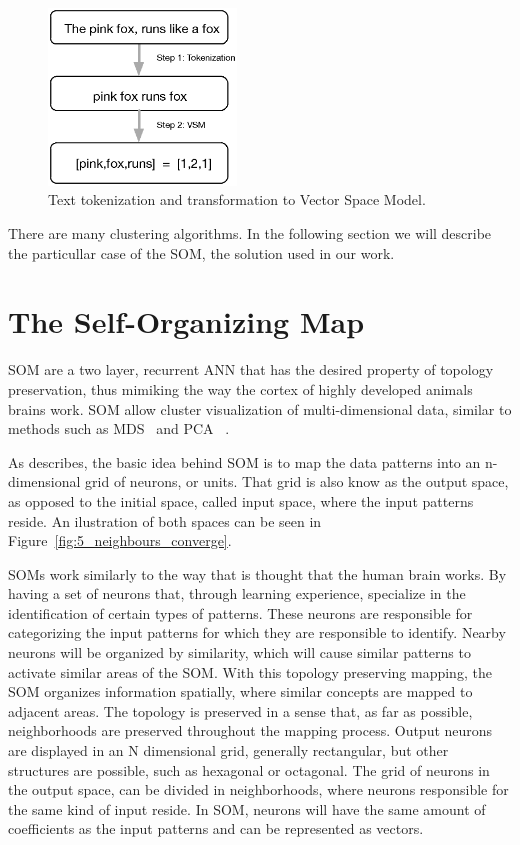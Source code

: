 \begin{figure}
  \begin{center}
    \includegraphics[width=5cm]{images/2_svm.eps}
  \end{center}
  \caption{ Text tokenization and transformation to Vector Space Model. }
  \label{fig:2_svm}
\end{figure}

There are many clustering algorithms. In the following section we will describe the particullar case of the \ac{SOM}, the solution used in our work.

\section{The Self-Organizing Map} 
\label{sec:the_self_organizing_map}

\ac{SOM} are a two layer, recurrent \ac{ANN} that has the desired property of topology preservation, thus mimiking the way the cortex of highly developed animals brains work. \ac{SOM} allow cluster visualization of multi-dimensional data, similar to methods such as \ac{MDS}~\cite{KruskalWish1978} and \ac{PCA}~\cite{Hotelling_1933} .  

As \citet{Bacao2005} describes, the basic idea behind SOM is to map the data patterns into an n-dimensional grid of neurons, or units. That grid is also know as the output space, as opposed to the initial space, called input space, where the input patterns reside. An ilustration of both spaces can be seen in Figure~\ref{fig:5_neighbours_converge}.

SOMs work similarly to the way that is thought that the human brain works. By having a set of neurons that, through learning experience, specialize in the identification of certain types of patterns. These neurons are responsible for categorizing the input patterns for which they are responsible to identify. Nearby neurons will be organized by similarity, which will cause similar patterns to activate similar areas of the \ac{SOM}.
With this topology preserving mapping, the SOM organizes information spatially, where similar concepts are mapped to adjacent areas. The topology is preserved in a sense that, as far as possible, neighborhoods are preserved throughout the mapping process.
Output neurons are displayed in an N dimensional grid, generally rectangular, but other structures are possible, such as hexagonal or octagonal.  The grid of neurons in the output space, can be divided in neighborhoods, where neurons responsible for the same kind of input reside.
In SOM, neurons will have the same amount of coefficients as the input patterns and can be represented as vectors.


